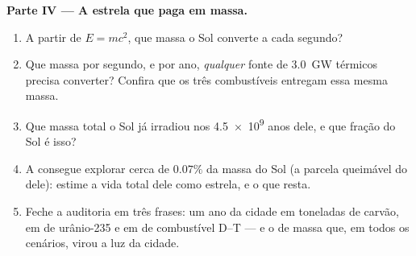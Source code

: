 \begin{problem}
\medskip
\noindent\textbf{Parte IV --- A estrela que paga em massa.}
\begin{enumerate}[resume]
  \item A partir de $E = mc^2$, que massa o Sol converte a cada segundo?
  \item Que massa por segundo, e por ano, \emph{qualquer} fonte de \qty{3.0}{GW}
        térmicos precisa converter? Confira que os três combustíveis entregam essa mesma
        massa.
  \item Que massa total o Sol já irradiou nos \num{4.5e9} anos dele, e que fração do Sol
        é isso?
  \item A  consegue explorar cerca de $0.07\%$ da massa do Sol (a parcela queimável
        do  dele): estime a vida total dele como estrela, e o que resta.
  \item Feche a auditoria em três frases: um ano da cidade em toneladas de carvão, em
         de urânio-235 e em  de combustível D--T --- e o
         de massa que, em todos os cenários, virou a luz da cidade.
\end{enumerate}
\end{problem}
